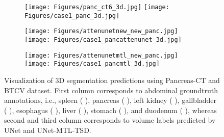 \documentclass[final,5p,times,twocolumn]{elsarticle}
\begin{document}
\begin{figure}[!hbt]
\begin{subfigure}[b]{.27\textwidth}
\hspace{-2cm}
\texttt{[image: Figures/panc\_ct6\_3d.jpg]}
\hfill
\texttt{[image: Figures/case1\_panc\_3d.jpg]}
\label{fig:sub34}
\end{subfigure}\begin{subfigure}[b]{.27\textwidth}
\centering
\texttt{[image: Figures/attenunetnew\_new\_panc.jpg]}
\hfill
\texttt{[image: Figures/case1\_pancattenunet\_3d.jpg]}
\label{fig:sub35}
\end{subfigure}
\begin{subfigure}[b]{.27\textwidth}
\centering
\texttt{[image: Figures/attenunetmtl\_new\_panc.jpg]}
\hfill
\texttt{[image: Figures/case1\_pancmtl\_3d.jpg]}
\label{fig:sub36}
\end{subfigure}
\caption{Visualization of 3D segmentation predictions using Pancreas-CT and BTCV dataset. First column corresponds to abdominal groundtruth annotations, i.e., spleen (  ), pancreas (  ), left kidney (  ), gallbladder (  ), esophagus (  ), liver (  ), stomach (  ), and duodenum (  ), whereas second and third column corresponds to volume labels predicted by UNet and UNet-MTL-TSD.}
\label{fig:sub37}
\end{figure}
\end{document}
